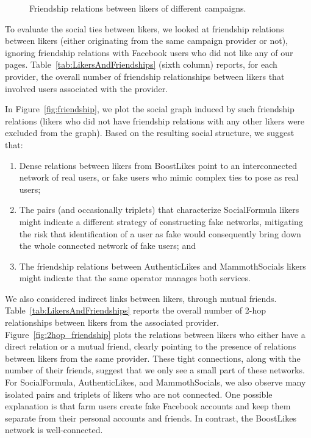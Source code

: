 \documentclass[twocolumn,10pt,letterpaper]{article}
\begin{document}
\begin{figure*}[t!]
\centering
         \hspace*{-0.35cm}
         \addtocounter{subfigure}{-1}\hspace*{-0.5cm}
%
\caption{Friendship relations between likers of different campaigns.}
\label{fig:friendshipGraph_withALMS}
%
\end{figure*}

To evaluate the social ties between likers, we looked at friendship relations between likers (either originating from the same campaign provider or not), ignoring friendship relations with Facebook users who did not like any of our pages. Table~\ref{tab:LikersAndFriendships} (sixth column) reports, for each provider, the overall number of friendship relationships between likers that involved users associated with the provider.

In Figure~\ref{fig:friendship}, we plot the social graph induced by such friendship relations (likers who did not have friendship relations with any other likers were excluded from the graph). %
Based on the resulting social structure, we suggest that: %
\begin{enumerate}
\item
 Dense relations between likers from BoostLikes point to an interconnected network of real users, or fake users who mimic complex ties to pose as real users;
\item
 The pairs (and occasionally triplets) that characterize SocialFormula likers might indicate a different strategy of constructing fake networks, mitigating the risk that identification of a user as fake would consequently bring down the whole connected network of fake users; and
\item
 The friendship relations between AuthenticLikes and MammothSocials likers might indicate that the same operator manages both services.
%
\end{enumerate}


%
We also considered indirect links between likers, through mutual friends.
%
Table~\ref{tab:LikersAndFriendships} reports the overall number of 2-hop relationships between likers from the associated provider.
%
Figure~\ref{fig:2hop_friendship} plots the relations between likers who either have a direct  relation or a mutual friend, clearly pointing to the presence of relations between likers from the same provider.
%
These tight connections, along with the number of their friends, suggest that we only see a small part of these networks.
%
For SocialFormula, AuthenticLikes, and MammothSocials, we also observe many isolated pairs and triplets of likers who are not connected. One possible explanation is that farm users create fake Facebook accounts and keep them separate from their personal accounts and friends.
%
In contrast, the BoostLikes network is well-connected.
\end{document}
